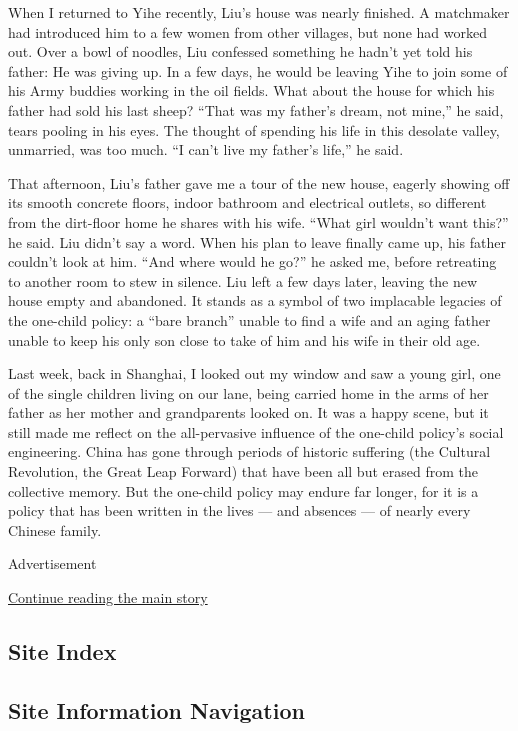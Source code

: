 When I returned to Yihe recently, Liu's house was nearly finished. A
matchmaker had introduced him to a few women from other villages, but
none had worked out. Over a bowl of noodles, Liu confessed something he
hadn't yet told his father: He was giving up. In a few days, he would be
leaving Yihe to join some of his Army buddies working in the oil fields.
What about the house for which his father had sold his last sheep?
``That was my father's dream, not mine,'' he said, tears pooling in his
eyes. The thought of spending his life in this desolate valley,
unmarried, was too much. ``I can't live my father's life,'' he said.

That afternoon, Liu's father gave me a tour of the new house, eagerly
showing off its smooth concrete floors, indoor bathroom and electrical
outlets, so different from the dirt-floor home he shares with his wife.
``What girl wouldn't want this?'' he said. Liu didn't say a word. When
his plan to leave finally came up, his father couldn't look at him.
``And where would he go?'' he asked me, before retreating to another
room to stew in silence. Liu left a few days later, leaving the new
house empty and abandoned. It stands as a symbol of two implacable
legacies of the one-child policy: a ``bare branch'' unable to find a
wife and an aging father unable to keep his only son close to take of
him and his wife in their old age.

Last week, back in Shanghai, I looked out my window and saw a young
girl, one of the single children living on our lane, being carried home
in the arms of her father as her mother and grandparents looked on. It
was a happy scene, but it still made me reflect on the all-pervasive
influence of the one-child policy's social engineering. China has gone
through periods of historic suffering (the Cultural Revolution, the
Great Leap Forward) that have been all but erased from the collective
memory. But the one-child policy may endure far longer, for it is a
policy that has been written in the lives --- and absences --- of nearly
every Chinese family.

Advertisement

\protect\hyperlink{after-bottom}{Continue reading the main story}

\hypertarget{site-index}{%
\subsection{Site Index}\label{site-index}}

\hypertarget{site-information-navigation}{%
\subsection{Site Information
Navigation}\label{site-information-navigation}}

